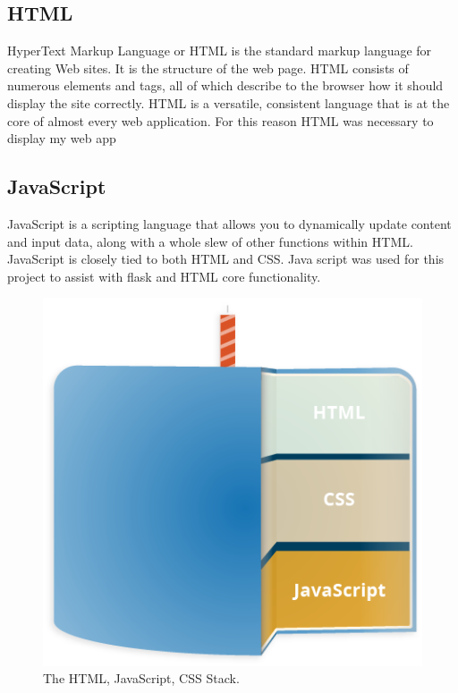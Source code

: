 \subsection{HTML}
HyperText Markup Language or HTML is the standard markup language for creating Web sites. It is the structure of the web page. HTML consists of numerous elements and tags, all of which describe to the browser how it should display the site correctly. HTML is a versatile, consistent language that is at the core of almost every web application. For this reason HTML was necessary to display my web app~\cite{html}

\subsection{JavaScript}
JavaScript is a scripting language that allows you to dynamically update content and input data, along with a whole slew of other functions within HTML. 
JavaScript is closely tied to both HTML and CSS. Java script was used for this project to assist with flask and HTML core functionality.
\begin{figure}[!htbp] 
    \centering
    \includegraphics[scale = 0.35]{img/cake.png}
    \caption{The HTML, JavaScript, CSS Stack.}
    \label{fig:my_label}
\end{figure}

